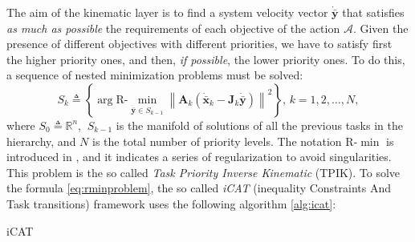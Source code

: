 The aim of the kinematic layer is to find a system velocity vector $\dot{\bar{\boldsymbol{y}}}$ that satisfies \textit{as much as possible} the requirements of each objective of the action $\mathcal{A}$. Given the presence of different objectives with different priorities, we have to satisfy first the higher priority ones, and then, \textit{if possible}, the lower priority ones. To do this, a sequence of nested minimization problems must be solved: 
\begin{equation}\label{eq:rminproblem}
S_k \triangleq \left\{ \arg \mathrm{R\textrm{-}}\min_{\dot{\bar{\boldsymbol{y}}} \in S_{k-1}} \left\| \boldsymbol{A}_k (\dot{\bar{\boldsymbol{x}}}_k - \boldsymbol{J}_k \dot{\bar{\boldsymbol{y}}}) \right\|^2 \right\},\, k = 1, 2, \ldots, N,
\end{equation}
where $S_0 \triangleq \mathbb{R}^n$, $\:S_{k-1}$ is the manifold of solutions of all the previous tasks in the hierarchy, and $N$ is the total number of priority levels. The notation $\mathrm{R\textrm{-}}\min$ is introduced in \cite{IntroMaris1}, and it indicates a series of regularization to avoid singularities.\\
This problem is the so called \textit{Task Priority Inverse Kinematic} (TPIK). To solve the formula  \eqref{eq:rminproblem}, the so called \textit{iCAT} (inequality Constraints And Task transitions) framework uses the following algorithm \ref{alg:icat}:
\begin{algorithm}[H]
	\caption{iCAT} \label{alg:icat}
	\begin{algorithmic} [1] {\large
		\vspace{5px}
		\vspace{5px}
				\vspace{5px}
		\vspace{5px}
		\vspace{5px}
		\ENDFOR 
		\vspace{5px}
	}
	\end{algorithmic}
\end{algorithm}

